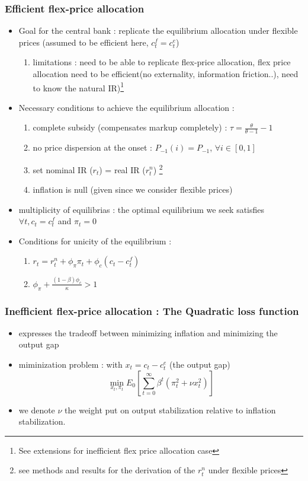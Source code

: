 \documentclass{article}
\begin{document}
\subsubsection{Efficient flex-price allocation}
\begin{itemize}
    \item Goal for the central bank : replicate the equilibrium allocation under flexible prices (assumed to be efficient here, $c_t^f=c_t^e$)
    \begin{enumerate}
        \item limitations : need to be able to replicate flex-price allocation, flex price allocation need to be efficient(no externality, information friction..), need to know the natural IR)\footnote{See extensions for inefficient flex price allocation case}
    \end{enumerate}
    \item Necessary conditions to achieve the equilibrium allocation : 
    \begin{enumerate}
        \item complete subsidy (compensates markup completely) : $\tau = \frac{\theta}{\theta-1}-1$ 
        \item no price dispersion at the onset : $P_{-1}(i)=P_{-1}$, $\forall i\in[0,1]$
        \item set nominal IR ($r_t$) = real IR ($r_t^n$) \footnote{see methods and results for the derivation of the $r_t^n$ under flexible prices}
        \item inflation is null (given since we consider flexible prices)
    \end{enumerate}
    \item multiplicity of equilibrias : the optimal equilibrium we seek satisfies $\forall t, c_t=c_t^f$ and $\pi_t=0$
    \item Conditions for unicity of the equilibrium : 
    \begin{enumerate}
        \item $r_t=r_t^n+\phi_{\pi}\pi_t+\phi_c(c_t-c_t^f)$
        \item $\phi_{\pi}+\frac{(1-\beta)\phi_c}{\kappa} > 1$
    \end{enumerate}
\end{itemize}
\subsubsection{Inefficient flex-price allocation : The Quadratic loss function}
\begin{itemize}
    \item expresses the tradeoff between minimizing inflation and minimizing the output gap
    \item miminization problem : with $x_t = c_t-c_t^e$ (the output gap)
    \begin{equation}
    \min_{x_t,\pi_t}E_0[\sum_{t=0}^{\infty}\beta^t(\pi_t^2+\nu x_t^2)]
    \end{equation}
    \item we denote $\nu$ the weight put on output stabilization relative to inflation stabilization.
\end{itemize}
\end{document}
